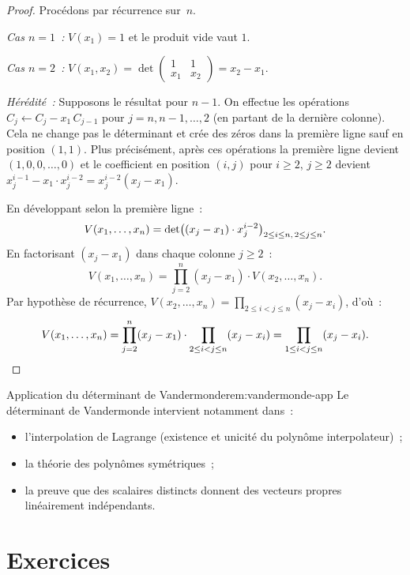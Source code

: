 \begin{proof}
  Procédons par récurrence sur~$n$.

  \emph{Cas $n=1$~:} $V(x_1)=1$ et le produit vide vaut $1$.

  \emph{Cas $n=2$~:}
  $V(x_1,x_2)=\det\begin{pmatrix}1&1\\x_1&x_2\end{pmatrix}
  =x_2-x_1$.

  \emph{Hérédité~:} Supposons le résultat pour $n-1$. On effectue les
  opérations $C_j\leftarrow C_j-x_1\,C_{j-1}$ pour $j=n,n-1,\ldots,2$
  (en partant de la dernière colonne). Cela ne change pas le déterminant
  et crée des zéros dans la première ligne sauf en position $(1,1)$.
  Plus précisément, après ces opérations la première ligne devient
  $(1,0,0,\ldots,0)$ et le coefficient en position $(i,j)$ pour
  $i\geq 2$, $j\geq 2$ devient $x_j^{i-1}-x_1\cdot x_j^{i-2}
  =x_j^{i-2}(x_j-x_1)$.

  En développant selon la première ligne~:
  \[
    V(x_1,\ldots,x_n)=\det\bigl((x_j-x_1)\cdot x_j^{i-2}\bigr)_{%
    2\leq i\leq n,\,2\leq j\leq n}.
  \]
  En factorisant $(x_j-x_1)$ dans chaque colonne $j\geq 2$~:
  \[
    V(x_1,\ldots,x_n)=\prod_{j=2}^{n}(x_j-x_1)\cdot
    V(x_2,\ldots,x_n).
  \]
  Par hypothèse de récurrence,
  $V(x_2,\ldots,x_n)=\prod_{2\leq i<j\leq n}(x_j-x_i)$, d'où~:
  \[
    V(x_1,\ldots,x_n)=\prod_{j=2}^{n}(x_j-x_1)\cdot
    \prod_{2\leq i<j\leq n}(x_j-x_i)=\prod_{1\leq i<j\leq n}(x_j-x_i).
    \qedhere
  \]
\end{proof}

\begin{remark}{Application du déterminant de Vandermonde}{rem:vandermonde-app}
  Le déterminant de Vandermonde intervient notamment dans~:
  \begin{itemize}
    \item l'interpolation de Lagrange
      (existence et unicité du polynôme interpolateur)~;
    \item la théorie des polynômes symétriques~;
    \item la preuve que des scalaires distincts donnent des vecteurs
      propres linéairement indépendants.
  \end{itemize}
\end{remark}

\section{Exercices}\label{sec:exercices-det}

